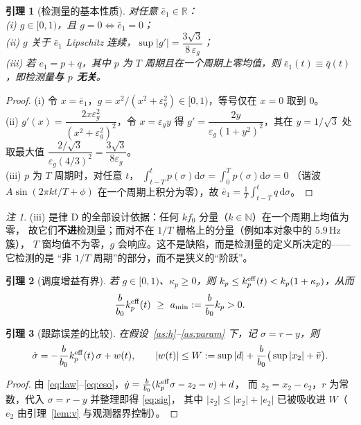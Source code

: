 \documentclass[11pt,a4paper]{article}
\newtheorem{lemma}{引理}
\theoremstyle{remark}
\newtheorem{remark}{注}
\begin{document}
\begin{lemma}[检测量的基本性质]\label{lem:det}
对任意 $\bar e_1\in\mathbb R$：\\
(i) $g\in[0,1)$，且 $g=0\iff\bar e_1=0$；\\
(ii) $g$ 关于 $\bar e_1$ Lipschitz 连续，$\sup|g'|=\dfrac{3\sqrt3}{8\,\varepsilon_g}$；\\
(iii) 若 $e_1=p+q$，其中 $p$ 为 $T$ 周期且在一个周期上零均值，则
$\bar e_1(t)\equiv \bar q(t)$，即检测量\textbf{与 $p$ 无关}。
\end{lemma}
\begin{proof}
(i) 令 $x=\bar e_1$，$g=x^2/(x^2+\varepsilon_g^2)\in[0,1)$，等号仅在 $x=0$ 取到 $0$。\\
(ii) $g'(x)=\dfrac{2x\varepsilon_g^2}{(x^2+\varepsilon_g^2)^2}$，令 $x=\varepsilon_g y$ 得
$g'=\dfrac{2y}{\varepsilon_g(1+y^2)^2}$，其在 $y=1/\sqrt3$ 处取最大值
$\dfrac{2/\sqrt3}{\varepsilon_g(4/3)^2}=\dfrac{3\sqrt3}{8\varepsilon_g}$。\\
(iii) $p$ 为 $T$ 周期时，对任意 $t$，
$\int_{t-T}^{t}p(\sigma)\mathrm d\sigma=\int_{0}^{T}p(\sigma)\mathrm d\sigma=0$
（谐波 $A\sin(2\pi k t/T+\phi)$ 在一个周期上积分为零），故
$\bar e_1=\frac1T\int_{t-T}^t q\,\mathrm d\sigma$。
\end{proof}
\begin{remark}
(iii) 是律 D 的全部设计依据：任何 $k f_0$ 分量（$k\in\mathbb N$）在一个周期上均值为零，
故它们\textbf{不进}检测量；而对不在 $1/T$ 栅格上的分量（例如本对象中的 $5.9$\,Hz 簇），
$T$ 窗均值不为零，$g$ 会响应。这不是缺陷，而是检测量的定义所决定的——它检测的是
“非 $1/T$ 周期”的部分，而不是狭义的“阶跃”。
\end{remark}

\begin{lemma}[调度增益有界]\label{lem:kpgain}
若 $g\in[0,1)$、$\kappa_p\ge0$，则 $k_p\le k_p^{\rm eff}(t)<k_p(1+\kappa_p)$，从而
\begin{equation}
\frac{b}{b_0}k_p^{\rm eff}(t)\ \ge\ a_{\min}:=\frac{b}{b_0}k_p>0 .
\label{eq:kpmin}
\end{equation}
\end{lemma}

\begin{lemma}[跟踪误差的比较]\label{lem:track-cmp}
在假设~\ref{as:h}--\ref{as:param} 下，记 $\sigma=r-y$，则
\begin{equation}
\dot\sigma=-\frac{b}{b_0}k_p^{\rm eff}(t)\,\sigma+w(t),\qquad
|w(t)|\le W:=\sup|d|+\frac{b}{b_0}\big(\sup|x_2|+\bar v\big).
\label{eq:sig}
\end{equation}
\end{lemma}
\begin{proof}
由 \eqref{eq:law}--\eqref{eq:eso}，$\dot y=\frac{b}{b_0}(k_p^{\rm eff}\sigma-z_2-v)+d$，
而 $z_2=x_2-e_2$，$r$ 为常数，代入 $\sigma=r-y$ 并整理即得 \eqref{eq:sig}，
其中 $|z_2|\le|x_2|+|e_2|$ 已被吸收进 $W$（$e_2$ 由引理~\ref{lem:v} 与观测器界控制）。
\end{proof}
\end{document}
